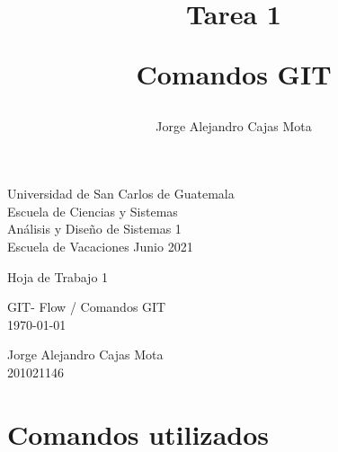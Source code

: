 \documentclass[12pt,letterpaper]{article}
\author{Jorge Alejandro Cajas Mota}
\title{ \begin{huge}Tarea 1\\\end{huge} Comandos GIT  }
\begin{document}
	\noindent 
	Universidad de San Carlos de Guatemala \\
	Escuela de Ciencias y Sistemas \\
	Análisis y Diseño de Sistemas 1 \\
	Escuela de Vacaciones Junio 2021
	
	\vspace{8cm}
	\begin{center}
		\begin{huge}
			Hoja de Trabajo 1\\
		\end{huge} 
		GIT- Flow / Comandos GIT\\
		\today
	\end{center}
	\vspace{8cm}
	
	\begin{flushright}
	Jorge Alejandro Cajas Mota\\
	201021146
	\end{flushright}
	
	\newpage
	\section*{Comandos utilizados}
	
\end{document}
